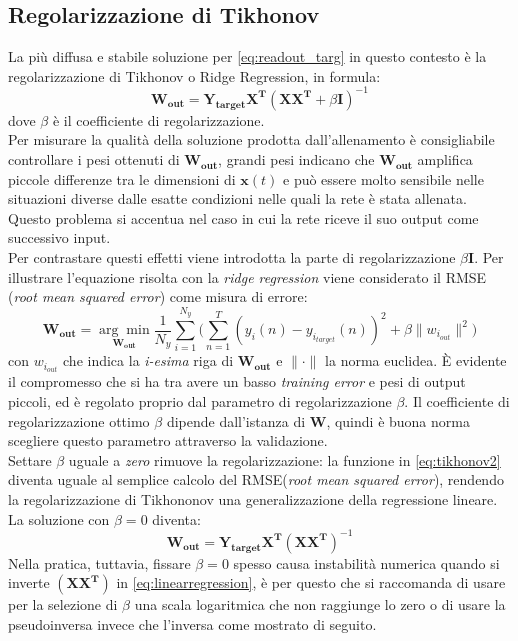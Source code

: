 \subsection{Regolarizzazione di Tikhonov}
La più diffusa e stabile soluzione per \ref{eq:readout_targ} in questo contesto è la regolarizzazione di Tikhonov o Ridge Regression, in formula:
\begin{equation} \label{eq:tikhonov}
\mathbf{W_{out}}= \mathbf{Y_{target}X^T} (\mathbf{XX^T} + \beta\mathbf{I})^{-1}
\end{equation}
dove $\beta$ è il coefficiente di regolarizzazione.\\
Per misurare la qualità della soluzione prodotta dall'allenamento è consigliabile controllare i pesi ottenuti di $\mathbf{W_{out}}$, grandi pesi indicano che $\mathbf{W_{out}}$ amplifica piccole differenze tra le dimensioni di $\mathbf{x}(t)$ e può essere molto sensibile nelle situazioni diverse dalle esatte condizioni nelle quali la rete è stata allenata. Questo problema si accentua nel caso in cui la rete riceve il suo output come successivo input.\\
Per contrastare questi effetti viene introdotta la parte di regolarizzazione  $\beta\mathbf{I}$. Per illustrare l'equazione risolta con la \textit{ridge regression} viene considerato il RMSE (\textit{root mean squared error}) come misura di errore:
\begin{equation} \label{eq:tikhonov2}
\mathbf{W_{out}}= \underset{\mathbf{W_{out}}}{\arg\min} \frac{1}{N_y} \sum\limits_{i=1}^{N_y} \biggl( \sum\limits_{n=1}^{T} (y_i(n)-y_{i_{target}}(n))^2 + \beta \| w_{i_{out}} \|^2 \biggr)
\end{equation}
con $w_{i_{out}}$ che indica la \textit{i-esima} riga di $\mathbf{W_{out}}$ e $\|\cdot\|$ la norma euclidea. È evidente il compromesso che si ha tra avere un basso \textit{training error} e pesi di output piccoli, ed è regolato proprio dal parametro di regolarizzazione $\beta$.
Il coefficiente di regolarizzazione ottimo $\beta$ dipende dall'istanza di $\mathbf{W}$, quindi è buona norma scegliere questo parametro attraverso la validazione.\\
Settare $\beta$ uguale a \textit{zero} rimuove la regolarizzazione: la funzione in \ref{eq:tikhonov2} diventa uguale al semplice calcolo del RMSE(\textit{root mean squared error}),
rendendo la regolarizzazione di Tikhononov una generalizzazione della regressione lineare.\\
La soluzione con $\beta=0 $ diventa:
\begin{equation} \label{eq:linearregression}
\mathbf{W_{out}}= \mathbf{Y_{target}X^T} (\mathbf{XX^T})^{-1}
\end{equation}
Nella pratica, tuttavia, fissare $\beta=0 $ spesso causa instabilità numerica quando si inverte $(\mathbf{XX^T})$ in \ref{eq:linearregression}, è per questo che si raccomanda di usare per la selezione di $\beta$ una scala logaritmica che non raggiunge lo zero o di usare la pseudoinversa invece che l'inversa come mostrato di seguito.

